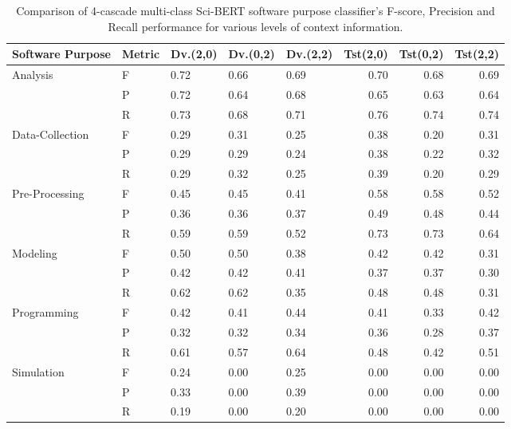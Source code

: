 \begin{table}[ht]
	\centering
	\caption{Comparison of 4-cascade multi-class Sci-BERT software purpose classifier's F-score, Precision and Recall performance for various levels of context information.}
	\begin{tabular*}{1\textwidth}{@{\extracolsep{\fill}}  l  l l  l l r r r } %
		\hline
		Software Purpose & Metric & Dv.(2,0)        & Dv.(0,2)     & Dv.(2,2)  &Tst(2,0) & Tst(0,2) & Tst(2,2) \\
		\hline 
		Analysis & F     & 0.72        & 0.66     &0.69     &0.70    &0.68     &0.69 \\
				 & P     & 0.72        & 0.64     &0.68     &0.65    &0.63     &0.64\\
		         & R     & 0.73        & 0.68     &0.71     &0.76    &0.74     &0.74\\
		\hline
		Data-Collection  & F     & 0.29        &  0.31    & 0.25    & 0.38   &0.20     &0.31\\
		                 & P     & 0.29        &  0.29    & 0.24    & 0.38   &0.22     &0.32\\
		                 & R     & 0.29        &  0.32    & 0.25    & 0.39   &0.20     &0.29\\		
		
		\hline
		Pre-Processing   & F     & 0.45        &  0.45    & 0.41    & 0.58   &0.58     &0.52\\
						 & P     & 0.36        &  0.36    & 0.37    & 0.49   &0.48     &0.44\\
						 & R     & 0.59        &  0.59    & 0.52    & 0.73   &0.73     &0.64\\
		\hline
		Modeling         & F     & 0.50        &  0.50    & 0.38    & 0.42   &0.42     &0.31\\
						 & P     & 0.42        &  0.42    & 0.41    & 0.37   &0.37     &0.30\\
						 & R     & 0.62        &  0.62    & 0.35    & 0.48   &0.48     &0.31\\
		
		\hline
		Programming      & F     & 0.42        &  0.41    & 0.44    & 0.41   &0.33     &0.42\\
						 & P     & 0.32        &  0.32    & 0.34    & 0.36   &0.28     &0.37\\
						 & R     & 0.61        &  0.57    & 0.64    & 0.48   &0.42     &0.51\\
		
		\hline
		Simulation      & F     & 0.24        &  0.00    & 0.25    & 0.00   &0.00     &0.00\\
						& P     & 0.33        &  0.00    & 0.39    & 0.00   &0.00     &0.00\\
						& R     & 0.19        &  0.00    & 0.20    & 0.00   &0.00     &0.00\\
		

\end{tabular*}
\end{table}
